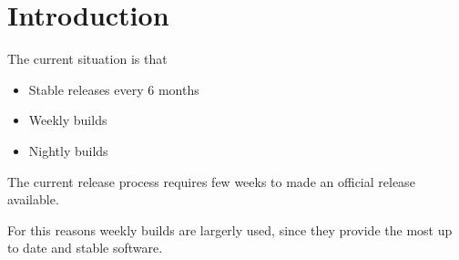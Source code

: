 \section{Introduction} \label{sec:intro}

The current situation is  that 
\begin{itemize}
\item Stable releases every 6 months 
\item Weekly builds
\item Nightly builds 
\end{itemize}

The current release process requires few weeks to made an official release available.

For this reasons weekly builds are largerly used, since they provide the most up to date and stable software.


